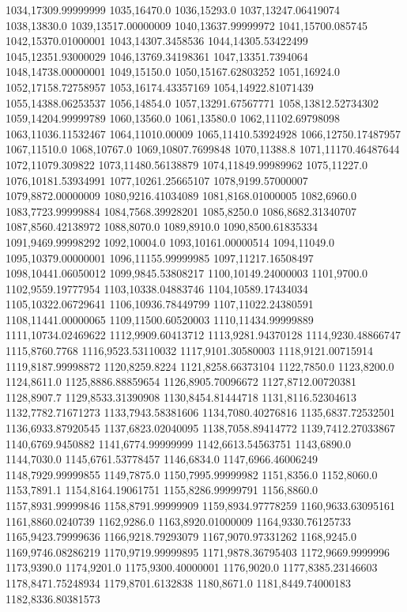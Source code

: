 1034,17309.99999999
1035,16470.0
1036,15293.0
1037,13247.06419074
1038,13830.0
1039,13517.00000009
1040,13637.99999972
1041,15700.085745
1042,15370.01000001
1043,14307.3458536
1044,14305.53422499
1045,12351.93000029
1046,13769.34198361
1047,13351.7394064
1048,14738.00000001
1049,15150.0
1050,15167.62803252
1051,16924.0
1052,17158.72758957
1053,16174.43357169
1054,14922.81071439
1055,14388.06253537
1056,14854.0
1057,13291.67567771
1058,13812.52734302
1059,14204.99999789
1060,13560.0
1061,13580.0
1062,11102.69798098
1063,11036.11532467
1064,11010.00009
1065,11410.53924928
1066,12750.17487957
1067,11510.0
1068,10767.0
1069,10807.7699848
1070,11388.8
1071,11170.46487644
1072,11079.309822
1073,11480.56138879
1074,11849.99989962
1075,11227.0
1076,10181.53934991
1077,10261.25665107
1078,9199.57000007
1079,8872.00000009
1080,9216.41034089
1081,8168.01000005
1082,6960.0
1083,7723.99999884
1084,7568.39928201
1085,8250.0
1086,8682.31340707
1087,8560.42138972
1088,8070.0
1089,8910.0
1090,8500.61835334
1091,9469.99998292
1092,10004.0
1093,10161.00000514
1094,11049.0
1095,10379.00000001
1096,11155.99999985
1097,11217.16508497
1098,10441.06050012
1099,9845.53808217
1100,10149.24000003
1101,9700.0
1102,9559.19777954
1103,10338.04883746
1104,10589.17434034
1105,10322.06729641
1106,10936.78449799
1107,11022.24380591
1108,11441.00000065
1109,11500.60520003
1110,11434.99999889
1111,10734.02469622
1112,9909.60413712
1113,9281.94370128
1114,9230.48866747
1115,8760.7768
1116,9523.53110032
1117,9101.30580003
1118,9121.00715914
1119,8187.99998872
1120,8259.8224
1121,8258.66373104
1122,7850.0
1123,8200.0
1124,8611.0
1125,8886.88859654
1126,8905.70096672
1127,8712.00720381
1128,8907.7
1129,8533.31390908
1130,8454.81444718
1131,8116.52304613
1132,7782.71671273
1133,7943.58381606
1134,7080.40276816
1135,6837.72532501
1136,6933.87920545
1137,6823.02040095
1138,7058.89414772
1139,7412.27033867
1140,6769.9450882
1141,6774.99999999
1142,6613.54563751
1143,6890.0
1144,7030.0
1145,6761.53778457
1146,6834.0
1147,6966.46006249
1148,7929.99999855
1149,7875.0
1150,7995.99999982
1151,8356.0
1152,8060.0
1153,7891.1
1154,8164.19061751
1155,8286.99999791
1156,8860.0
1157,8931.99999846
1158,8791.99999909
1159,8934.97778259
1160,9633.63095161
1161,8860.0240739
1162,9286.0
1163,8920.01000009
1164,9330.76125733
1165,9423.79999636
1166,9218.79293079
1167,9070.97331262
1168,9245.0
1169,9746.08286219
1170,9719.99999895
1171,9878.36795403
1172,9669.9999996
1173,9390.0
1174,9201.0
1175,9300.40000001
1176,9020.0
1177,8385.23146603
1178,8471.75248934
1179,8701.6132838
1180,8671.0
1181,8449.74000183
1182,8336.80381573
